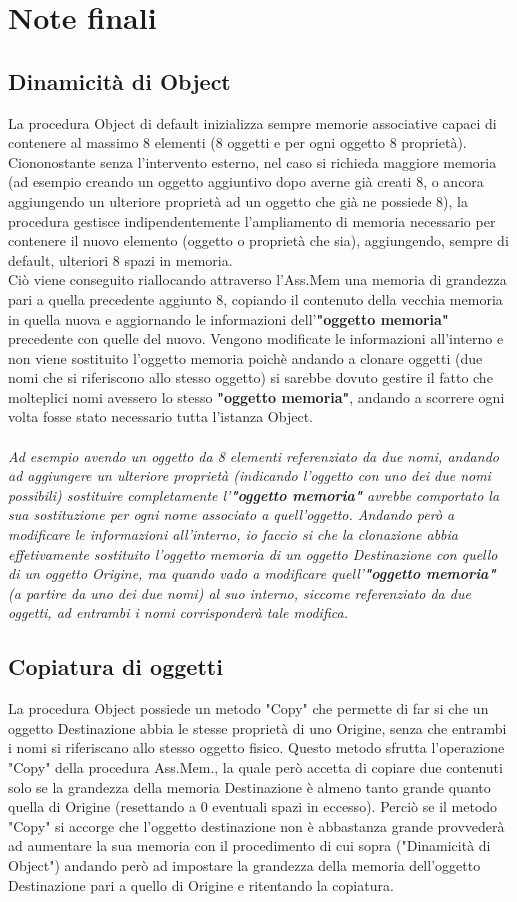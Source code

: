 \documentclass[a4paper]{article}
\begin{document}
\section{Note finali}
\subsection{Dinamicità di Object}
La procedura Object di default inizializza sempre memorie associative capaci di contenere al massimo 8 elementi (8 oggetti e per ogni oggetto 8 proprietà). Ciononostante senza l'intervento esterno, nel caso si richieda maggiore memoria (ad esempio creando un oggetto aggiuntivo dopo averne già creati 8, o ancora aggiungendo un ulteriore proprietà ad un oggetto che già ne possiede 8), la procedura gestisce indipendentemente l'ampliamento di memoria necessario per contenere il nuovo elemento (oggetto o proprietà che sia), aggiungendo, sempre di default, ulteriori 8 spazi in memoria.
\\
Ciò viene conseguito riallocando attraverso l'Ass.Mem una memoria di grandezza pari a quella precedente aggiunto 8, copiando il contenuto della vecchia memoria in quella nuova e aggiornando le informazioni dell'\textbf{"oggetto memoria"} precedente con quelle del nuovo. Vengono modificate le informazioni all'interno e non viene sostituito l'oggetto memoria poichè andando a clonare oggetti (due nomi che si riferiscono allo stesso oggetto) si sarebbe dovuto gestire il fatto che molteplici nomi avessero lo stesso \textbf{"oggetto memoria"}, andando a scorrere ogni volta fosse stato necessario tutta l'istanza Object.
\\\\
\textit{Ad esempio avendo un oggetto da 8 elementi referenziato da due nomi, andando ad aggiungere un ulteriore proprietà (indicando l'oggetto con uno dei due nomi possibili) sostituire completamente l'\textbf{"oggetto memoria"} avrebbe comportato la sua sostituzione per ogni nome associato a quell'oggetto. Andando però a modificare le informazioni all'interno, io faccio si che la clonazione abbia effetivamente sostituito l'oggetto memoria di un oggetto Destinazione con quello di un oggetto Origine, ma quando vado a modificare quell'\textbf{"oggetto memoria"} (a partire da uno dei due nomi) al suo interno, siccome referenziato da due oggetti, ad entrambi i nomi corrisponderà tale modifica.}
\subsection{Copiatura di oggetti}
La procedura Object possiede un metodo "Copy" che permette di far si che un oggetto Destinazione abbia le stesse proprietà di uno Origine, senza che entrambi i nomi si riferiscano allo stesso oggetto fisico. Questo metodo sfrutta l'operazione "Copy" della procedura Ass.Mem., la quale però accetta di copiare due contenuti solo se la grandezza della memoria Destinazione è almeno tanto grande quanto quella di Origine (resettando a 0 eventuali spazi in eccesso). Perciò se il metodo "Copy" si accorge che l'oggetto destinazione non è abbastanza grande provvederà ad aumentare la sua memoria con il procedimento di cui sopra ("Dinamicità di Object") andando però ad impostare la grandezza della memoria dell'oggetto Destinazione pari a quello di Origine e ritentando la copiatura.
\end{document}
